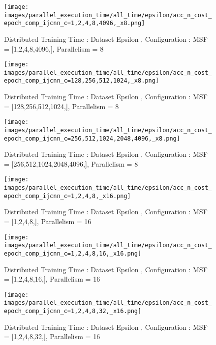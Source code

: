 \begin{figure*}[htbp]
\centering
\texttt{[image: images/parallel\_execution\_time/all\_time/epsilon/acc\_n\_cost\_epoch\_comp\_ijcnn\_c=1,2,4,8,4096,\_x8.png]}
\caption{Distributed Training Time : Dataset Epsilon , Configuration : MSF = [1,2,4,8,4096,], Parallelism = 8}
\label{fig:dis-msf-tr-time-epsilon-x8}
\end{figure*}


\begin{figure*}[htbp]
\centering
\texttt{[image: images/parallel\_execution\_time/all\_time/epsilon/acc\_n\_cost\_epoch\_comp\_ijcnn\_c=128,256,512,1024,\_x8.png]}
\caption{Distributed Training Time : Dataset Epsilon , Configuration : MSF = [128,256,512,1024,], Parallelism = 8}
\label{fig:dis-msf-tr-time-epsilon-x8}
\end{figure*}


\begin{figure*}[htbp]
\centering
\texttt{[image: images/parallel\_execution\_time/all\_time/epsilon/acc\_n\_cost\_epoch\_comp\_ijcnn\_c=256,512,1024,2048,4096,\_x8.png]}
\caption{Distributed Training Time : Dataset Epsilon , Configuration : MSF = [256,512,1024,2048,4096,], Parallelism = 8}
\label{fig:dis-msf-tr-time-epsilon-x8}
\end{figure*}


\begin{figure*}[htbp]
\centering
\texttt{[image: images/parallel\_execution\_time/all\_time/epsilon/acc\_n\_cost\_epoch\_comp\_ijcnn\_c=1,2,4,8,\_x16.png]}
\caption{Distributed Training Time : Dataset Epsilon , Configuration : MSF = [1,2,4,8,], Parallelism = 16}
\label{fig:dis-msf-tr-time-epsilon-x16}
\end{figure*}


\begin{figure*}[htbp]
\centering
\texttt{[image: images/parallel\_execution\_time/all\_time/epsilon/acc\_n\_cost\_epoch\_comp\_ijcnn\_c=1,2,4,8,16,\_x16.png]}
\caption{Distributed Training Time : Dataset Epsilon , Configuration : MSF = [1,2,4,8,16,], Parallelism = 16}
\label{fig:dis-msf-tr-time-epsilon-x16}
\end{figure*}


\begin{figure*}[htbp]
\centering
\texttt{[image: images/parallel\_execution\_time/all\_time/epsilon/acc\_n\_cost\_epoch\_comp\_ijcnn\_c=1,2,4,8,32,\_x16.png]}
\caption{Distributed Training Time : Dataset Epsilon , Configuration : MSF = [1,2,4,8,32,], Parallelism = 16}
\label{fig:dis-msf-tr-time-epsilon-x16}
\end{figure*}


